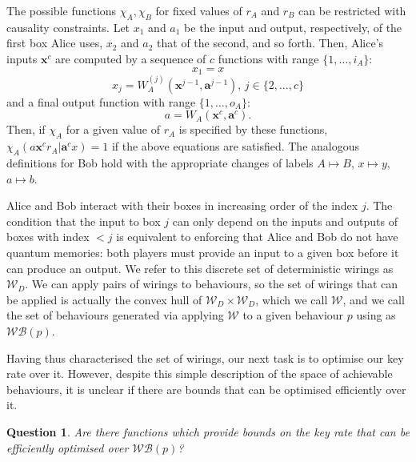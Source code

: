 \documentclass[10pt, a4paper]{article}
\numberwithin{equation}{section} %
\theoremstyle{definition}
\theoremstyle{plain}
\newtheorem{question}{Question}
\newcommand{\dintv}[2]{\mathopen\{#1,\ldots,#2\mathclose\}}
\newcommand{\?}{\mathrel{?}} %
\newcommand{\cvec}[1]{\boldsymbol{\mathbf{#1}}}    %
\newcommand{\sW}{\mathcal{W}}
\newcommand{\sWB}{\mathcal{WB}}
\begin{document}
      The possible functions \(\chi_A, \chi_B\) for fixed values of \(r_A\) and \(r_B\) can be restricted with causality constraints. Let \(x_1\) and \(a_1\) be the input and output, respectively, of the first box Alice uses, \(x_2\) and \(a_2\) that of the second, and so forth. Then, Alice's inputs \(\cvec{x}^c\) are computed by a sequence of \(c\) functions with range \(\dintv{1}{i_A}\):
      \begin{equation} x_1 = x \end{equation}
      \begin{equation} x_j = W^{(j)}_A(\cvec{x}^{j-1}, \cvec{a}^{j-1}),\,j \in \dintv{2}{c} \end{equation}
      and a final output function with range \(\dintv{1}{o_A}\):
      \begin{equation} a = W_A(\cvec{x}^{c}, \cvec{a}^{c}). \end{equation}
      Then, if \(\chi_A\) for a given value of \(r_A\) is specified by these functions, \(\chi_A(a\cvec{x}^c r_A|\cvec{a}^cx) = 1\) if the above equations are satisfied. The analogous definitions for Bob hold with the appropriate changes of labels \(A \mapsto B\), \(x \mapsto y\), \(a \mapsto b\). 

      Alice and Bob interact with their boxes in increasing order of the index \(j\). The condition that the input to box \(j\) can only depend on the inputs and outputs of boxes with index \(< j\) is equivalent to enforcing that Alice and Bob do not have quantum memories: both players must provide an input to a given box before it can produce an output. We refer to this discrete set of deterministic wirings as \(\sW_D\). We can apply pairs of wirings to behaviours, so the set of wirings that can be applied is actually the convex hull of \(\sW_D \times \sW_D\), which we call \(\sW\), and we call the set of behaviours generated via applying \(\sW\) to a given behaviour \(p\) using  as \(\sWB(p)\).

      Having thus characterised the set of wirings, our next task is to optimise our key rate over it. However, despite this simple description of the space of achievable behaviours, it is unclear if there are bounds that can be optimised efficiently over it.
      \begin{question}\label{qn:wirbehavkeyrate}
        Are there functions which provide bounds on the key rate that can be efficiently optimised over \(\sWB(p)\)?
      \end{question}
\end{document}
